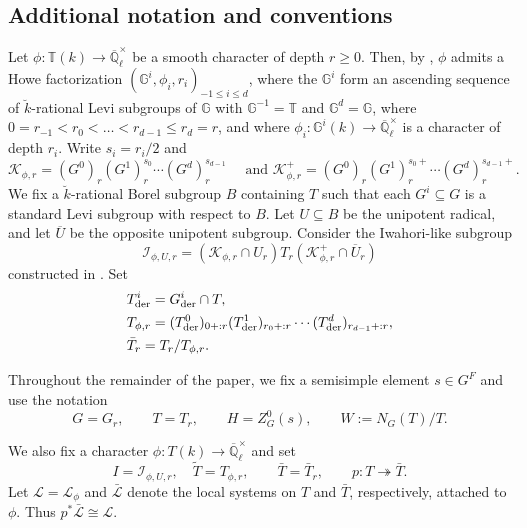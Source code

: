 \documentclass[11pt,letterpaper]{amsart}
\def\brk{{\breve k}}
\def\der{{\rm der}}
\newcommand{\ov}{\overline}
\theoremstyle{definition}
\numberwithin{equation}{section}
\numberwithin{theorem}{section}
\begin{document}
\subsection{Additional notation and conventions}\label{2.1}
Let $\phi:\mathbb{T}(k)\to\ov{\mathbb{Q}}_\ell^\times$ be a smooth character
of depth $r\geq0$. Then, by
\cite[Proposition 3.6.7]{Kaletha_19}, $\phi$ admits a Howe factorization
$(\mathbb{G}^i,\phi_i,r_i)_{-1\leq i\leq d}$, where the $\mathbb{G}^i$ form an ascending
sequence of $\breve k$-rational Levi subgroups of $\mathbb{G}$ with
$\mathbb{G}^{-1}=\mathbb{T}$ and $\mathbb{G}^d=\mathbb{G}$, where
$0=r_{-1}<r_0<\dots<r_{d-1}\leq r_d=r$, and where
$\phi_i:\mathbb{G}^i(k)\to\ov{\mathbb{Q}}_\ell^\times$ is a character of depth
$r_i$.
Write $s_i = r_i/2$ and
\[
\mathcal{K}_{\phi,r} = (G^0)_r (G^{1})^{s_0}_{r} \cdots (G^d)_{r}^{s_{d-1}} \quad \text{ and }\mathcal{K}^+_{\phi,r} = (G^0)_r (G^{1})^{s_0+}_{r} \cdots (G^d)_{r}^{s_{d-1}+}.
\]
We fix a $\brk$-rational Borel subgroup $B$ containing $T$ such that each
$G^i\subseteq G$ is a standard Levi subgroup with respect to $B$. Let
$U\subseteq B$ be the unipotent radical, and let $\ov U$ be the opposite
unipotent subgroup. Consider the Iwahori-like subgroup
\[
 \mathcal{I}_{\phi,U,r}
 = (\mathcal{K}_{\phi,r}\cap U_r)T_r
   (\mathcal{K}_{\phi,r}^+\cap\ov U_r)
\]
constructed in \cite{Nie_24}. Set 
\begin{align*}
&T^i_\der = G^i_\der \cap T,\\
&T_{\phi, r} = (T^0_\der)_{0+:r} (T^1_\der)_{r_0+:r} \cdots (T^d_\der)_{r_{d-1}+:r},\\
&\bar T_r = T_r/T_{\phi,r}.
\end{align*}

Throughout the remainder of the paper, we fix a semisimple element
\(s\in G^F\) and use the notation
\[
 G=G_r,\qquad T=T_r,\qquad H=Z^0_G(s),\qquad W:=N_{G}(T)/T.
\]

We also fix a character $\phi:T(k)\to\ov{\mathbb Q}_\ell^\times$ and set
\[
  I=\mathcal I_{\phi,U,r},\quad \tilde{T}=T_{\phi, r},
  \qquad \bar T=\bar T_r,\qquad
 p:T\twoheadrightarrow\bar T.
\]
Let $\mathcal{L}=\mathcal{L}_\phi$ and $\bar{\mathcal{L}}$ denote the
local systems on $T$ and $\bar T$, respectively, attached to $\phi$.
Thus $p^*\bar{\mathcal{L}}\cong\mathcal{L}$.
\end{document}
